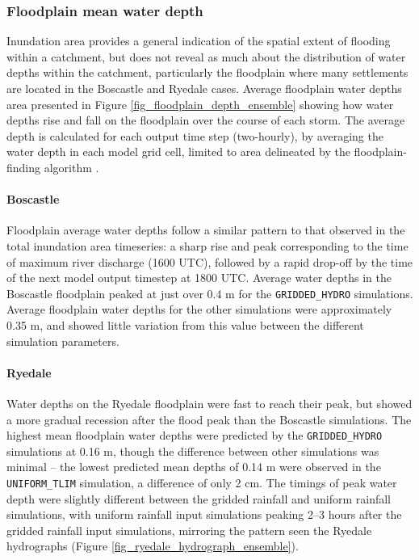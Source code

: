 \subsubsection{Floodplain mean water depth}

Inundation area provides a general indication of the spatial extent of flooding within a catchment, but does not reveal as much about the distribution of water depths within the catchment, particularly the floodplain where many settlements are located in the Boscastle and Ryedale cases. Average floodplain water depths area presented in Figure \ref{fig_floodplain_depth_ensemble} showing how water depths rise and fall on the floodplain over the course of each storm. The average depth is calculated for each output time step (two-hourly), by averaging the water depth in each model grid cell, limited to area delineated by the floodplain-finding algorithm \citep{clubbinpress}. 

\paragraph{Boscastle}
Floodplain average water depths follow a similar pattern to that observed in the total inundation area timeseries: a sharp rise and peak corresponding to the time of maximum river discharge (1600 UTC), followed by a rapid drop-off by the time of the next model output timestep at 1800 UTC. Average water depths in the Boscastle floodplain peaked at just over 0.4 m for the \texttt{GRIDDED\_HYDRO} simulations. Average floodplain water depths for the other simulations were approximately 0.35 m, and showed little variation from this value between the different simulation parameters. %

\paragraph{Ryedale}
Water depths on the Ryedale floodplain were fast to reach their peak, but showed a more gradual recession after the flood peak than the Boscastle simulations. The highest mean floodplain water depths were predicted by the \texttt{GRIDDED\_HYDRO} simulations at 0.16 m, though the difference between other simulations was minimal -- the lowest predicted mean depths of 0.14 m were observed in the \texttt{UNIFORM\_TLIM} simulation, a difference of only 2 cm. The timings of peak water depth were slightly different between the gridded rainfall and uniform rainfall simulations, with uniform rainfall input simulations peaking 2--3 hours after the gridded rainfall input simulations, mirroring the pattern seen the Ryedale hydrographs (Figure \ref{fig_ryedale_hydrograph_ensemble}).

